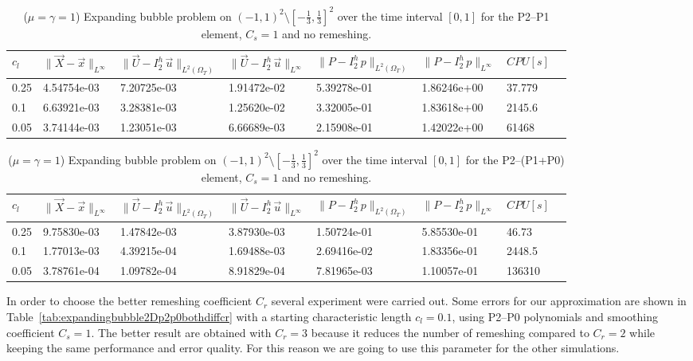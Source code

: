 \documentclass[a4paper,12pt,onecolumn]{article}
\newcommand{\errorXx}{\|\vec{X} - \vec{x}\|_{L^\infty}}
\newcommand{\LerrorUu}[1]{\|\vec U - I^h_{#1}\,\vec u\|_{L^2(\Omega_T)}}
\newcommand{\errorUu}[1]{\|\vec U - I^h_{#1}\,\vec u\|_{L^\infty}}
\newcommand{\errorPp}[1]{\|P - I^h_{#1}\,p\|_{L^\infty}}
\newcommand{\LerrorPp}[1]{\|P - I^h_{#1}\,p\|_{L^2(\Omega_T)}}
\begin{document}
\begin{table}
 \center
 \hspace*{-2cm}
\begin{tabular}{llllllll}
\hline
$c_l$ & $\errorXx$ & $\LerrorUu2$ & $\errorUu2$ & $\LerrorPp2$ & $\errorPp2$ & $CPU[s]$ \\
\hline
0.25 & 4.54754e-03 & 7.20725e-03 & 1.91472e-02 & 5.39278e-01 & 1.86246e+00 & 37.779\\
0.1 & 6.63921e-03 & 3.28381e-03 & 1.25620e-02 & 3.32005e-01 & 1.83618e+00 & 2145.6\\
0.05 & 3.74144e-03 & 1.23051e-03 & 6.66689e-03 & 2.15908e-01 & 1.42022e+00 & 61468\\%
\hline
\end{tabular}
\hspace*{-2cm}
\caption{($\mu=\gamma=1$) Expanding bubble problem on $(-1,1)^2\setminus[-\frac{1}{3},\frac{1}{3}]^2$ over the time interval $[0,1]$ for the P2--P1 element, $C_s=1$ and no remeshing.}
\label{tab:expandingbubble2Dp2p1smooth}
\end{table}

\begin{table}
 \center
 \hspace*{-2cm}
\begin{tabular}{llllllll}
\hline
$c_l$ & $\errorXx$ & $\LerrorUu2$ & $\errorUu2$ & $\LerrorPp2$ & $\errorPp2$ & $CPU[s]$\\
\hline
0.25 & 9.75830e-03 & 1.47842e-03 & 3.87930e-03 & 1.50724e-01 & 5.85530e-01 & 46.73\\
0.1 & 1.77013e-03 & 4.39215e-04 & 1.69488e-03 & 2.69416e-02 & 1.83356e-01 & 2448.5\\
0.05 & 3.78761e-04 & 1.09782e-04 & 8.91829e-04 & 7.81965e-03 & 1.10057e-01 & 136310\\%
\hline
\end{tabular}
\hspace*{-2cm}
\caption{($\mu=\gamma=1$) Expanding bubble problem on $(-1,1)^2\setminus[-\frac{1}{3},\frac{1}{3}]^2$ over the time interval $[0,1]$ for the P2--(P1+P0) element, $C_s=1$ and no remeshing.}
\label{tab:expandingbubble2Dp2p1p0smooth}
\end{table}

In order to choose the better remeshing coefficient $C_r$ several experiment were carried out. Some errors for our approximation are shown in Table~\ref{tab:expandingbubble2Dp2p0bothdiffcr} with a starting characteristic length $c_l=0.1$, using P2--P0 polynomials and smoothing coefficient $C_s=1$. The better result are obtained with $C_r=3$ because it reduces the number of remeshing compared to $C_r=2$ while keeping the same performance and error quality. For this reason we are going to use this parameter for the other simulations.
\end{document}
